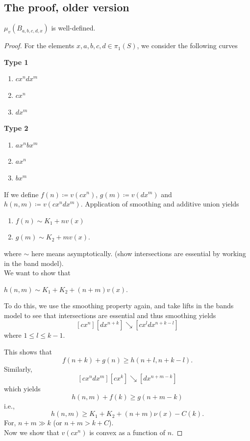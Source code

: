 
\subsection{The proof, older version}
\begin{proposition}\label{prop:premeasurewelldef}
$\mu_{v}(B_{a,b,c,d,x})$ is well-defined.
\end{proposition}
\begin{proof}
For the elements $x,a,b,c,d \in \pi_1(S)$, we consider the following curves

\textbf{Type 1}

\begin{enumerate}
\item $cx^ndx^m$
\item $cx^n$
\item $dx^m$
\end{enumerate}

\textbf{Type 2}

\begin{enumerate}
\item $ax^nbx^m$
\item $ax^n$
\item $bx^m$
\end{enumerate}


If we define $f(n)\coloneqq v(cx^n)$, $g(m)\coloneqq v(dx^m)$ and $h(n,m)\coloneqq v(cx^ndx^m)$.
Application of smoothing and additive union yields

\begin{enumerate}
\item $f(n) \sim K_1 + nv(x)$
\item $g(m) \sim K_2 + mv(x)$.
\end{enumerate}

where $\sim$ here means asymptotically.
(show intersections are essential by working in the band model).\\
We want to show that

$h(n,m) \sim K_1 + K_2 + (n+m)v(x)$.

To do this, we use the smoothing property again, and take lifts in the bands model to see that intersections are essential and thus smoothing yields
\[
  [cx^n][dx^{n+k}] \searrow [cx^ldx^{n+k-l}]
\]
where $1 \leq l \leq k-1$.

This shows that
\[
  f(n+k) + g(n) \geq h(n+l,n+k-l).
\]
Similarly,
\[
  [cx^ndx^m][cx^k] \searrow [dx^{n+m-k}]
\]
which yields
\[
  h(n,m) + f(k) \geq g(n+m-k)
\]
i.e.,
\[
  h(n,m) \geq K_1 + K_2 + (n+m)\nu(x) - C(k).
\]
For, $n+m \gg k$ (or $n+m > k + C$). \\

Now we show that $v(cx^n)$ is convex as a function of $n$.
\end{proof}